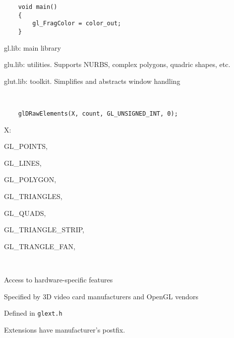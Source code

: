 \begin{compactdesc}
\begin{lstlisting}
	void main()
	{
		gl_FragColor = color_out;
	}
	\end{lstlisting}
\item[\lp{Integration}]
	\begin{itemize*}[label=\colorbullet]
		\item gl.lib: main library\\
		\item glu.lib: utilities. Supports NURBS, complex polygons, quadric shapes, etc.\\
		\item glut.lib: toolkit. Simplifies and abstracts window handling
	\end{itemize*}
\item[\lp{Primitives}]\hfill\\
	\begin{lstlisting}
	glDRawElements(X, count, GL_UNSIGNED_INT, 0);
	\end{lstlisting}
	X:\hfill\\
	\begin{enumerate*}[label=\protect\circled{\arabic*},itemjoin=]
		\item GL\_POINTS,\\
		\item GL\_LINES,\\
		\item GL\_POLYGON,\\
		\item GL\_TRIANGLES,\\
		\item GL\_QUADS,\\
		\item GL\_TRIANGLE\_STRIP,\\
		\item GL\_TRANGLE\_FAN,\\
	\end{enumerate*}
\item[\lp{Extensions}] \hfill\\
	\begin{enumerate*}[label=\protect\circled{\arabic*},itemjoin=]
		\item Access to hardware-specific features\\
		\item Specified by 3D video card manufacturers and OpenGL vendors\\
		\item Defined in \texttt{glext.h}\\
		\item Extensions have manufacturer's postfix.
	\end{enumerate*}
\end{compactdesc}
